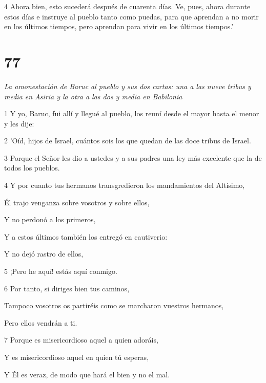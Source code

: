 \par 4 Ahora bien, esto sucederá después de cuarenta días. Ve, pues, ahora durante estos días e instruye al pueblo tanto como puedas, para que aprendan a no morir en los últimos tiempos, pero aprendan para vivir en los últimos tiempos.'

\chapter{77}

\par \textit{La amonestación de Baruc al pueblo y sus dos cartas: una a las nueve tribus y media en Asiria y la otra a las dos y media en Babilonia}


\par 1 Y yo, Baruc, fui allí y llegué al pueblo, los reuní desde el mayor hasta el menor y les dije:

\par 2 'Oíd, hijos de Israel, cuántos sois los que quedan de las doce tribus de Israel.

\par 3 Porque el Señor les dio a ustedes y a sus padres una ley más excelente que la de todos los pueblos.

\par 4 Y por cuanto tus hermanos transgredieron los mandamientos del Altísimo,

Él trajo venganza sobre vosotros y sobre ellos,

\par Y no perdonó a los primeros,

Y a estos últimos también los entregó en cautiverio:

Y no dejó rastro de ellos,

\par 5 ¡Pero he aquí! estás aquí conmigo.

\par 6 Por tanto, si diriges bien tus caminos,

Tampoco vosotros os partiréis como se marcharon vuestros hermanos,

\par Pero ellos vendrán a ti.

\par 7 Porque es misericordioso aquel a quien adoráis,

\par Y es misericordioso aquel en quien tú esperas,

Y Él es veraz, de modo que hará el bien y no el mal.

